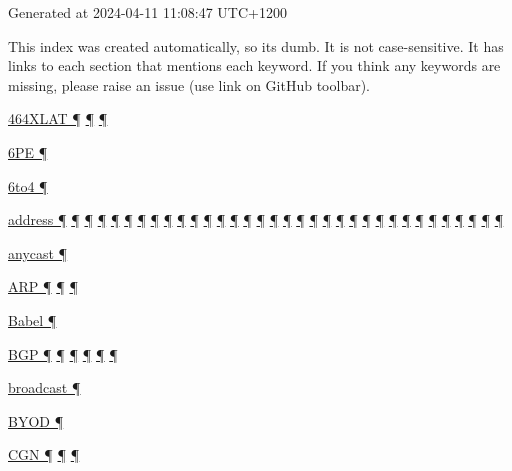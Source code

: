 \documentclass[
]{article}
\begin{document}
Generated at 2024-04-11 11:08:47 UTC+1200

This index was created automatically, so it\textquotesingle s dumb. It
is not case-sensitive. It has links to each section that mentions each
keyword. If you think any keywords are missing, please raise an issue
(use link on GitHub toolbar).

\hyperref[dual-stack-scenarios]{464XLAT ¶}
\hyperref[translation-and-ipv4-as-a-service]{¶}
\hyperref[deployment-by-carriers]{¶}

\hyperref[tunnels]{6PE ¶}

\hyperref[obsolete-techniques]{6to4 ¶}

\hyperref[how-a-user-sees-ipv6]{address ¶}
\hyperref[how-an-application-programmer-sees-ipv6]{¶}
\hyperref[why-version-6]{¶} \hyperref[ipv6-basic-technology]{¶}
\hyperref[address-resolution]{¶} \hyperref[addresses]{¶}
\hyperref[auto-configuration]{¶} \hyperref[dns]{¶}
\hyperref[layer-2-functions]{¶} \hyperref[managed-configuration]{¶}
\hyperref[packet-format]{¶} \hyperref[routing]{¶}
\hyperref[source-and-destination-address-selection]{¶}
\hyperref[coexistence-with-legacy-ipv4]{¶}
\hyperref[dual-stack-scenarios]{¶}
\hyperref[ipv6-primary-differences-from-ipv4]{¶}
\hyperref[obsolete-techniques]{¶}
\hyperref[translation-and-ipv4-as-a-service]{¶} \hyperref[tunnels]{¶}
\hyperref[security]{¶} \hyperref[filtering]{¶}
\hyperref[layer-2-considerations]{¶} \hyperref[topology-obfuscation]{¶}
\hyperref[network-design]{¶} \hyperref[address-planning]{¶}
\hyperref[address-and-prefix-management]{¶}
\hyperref[energy-consumption]{¶} \hyperref[multi-prefix-operation]{¶}
\hyperref[multihoming]{¶} \hyperref[cern-and-the-lhc]{¶}
\hyperref[deployment-by-carriers]{¶}
\hyperref[deployment-in-the-enterprise]{¶}
\hyperref[deployment-in-the-home]{¶} \hyperref[markdown-usage]{¶}

\hyperref[addresses]{anycast ¶}

\hyperref[address-resolution]{ARP ¶}
\hyperref[ipv6-primary-differences-from-ipv4]{¶}
\hyperref[layer-2-considerations]{¶}

\hyperref[routing]{Babel ¶}

\hyperref[addresses]{BGP ¶} \hyperref[routing]{¶}
\hyperref[further-reading]{¶} \hyperref[filtering]{¶}
\hyperref[multi-prefix-operation]{¶} \hyperref[multihoming]{¶}

\hyperref[ipv6-primary-differences-from-ipv4]{broadcast ¶}

\hyperref[address-and-prefix-management]{BYOD ¶}

\hyperref[dual-stack-scenarios]{CGN ¶} \hyperref[obsolete-techniques]{¶}
\hyperref[tunnels]{¶}
\end{document}
